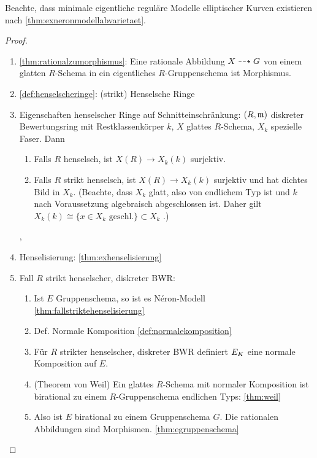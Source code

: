 \documentclass[german]{scrreprt}
\begin{document}
\begin{Satz}
  Beachte, dass minimale eigentliche reguläre Modelle elliptischer
  Kurven existieren nach \autoref{thm:exneronmodellabvarietaet}.
  \begin{proof}
    \begin{enumerate}
    \item \autoref{thm:rationalzumorphismus}:
      Eine rationale Abbildung $X\dashrightarrow G$ von einem glatten
      $R$-Schema in ein eigentliches $R$-Gruppenschema ist Morphismus.
    \item \autoref{def:henselscheringe}: (strikt) Henselsche Ringe
    \item Eigenschaften henselscher Ringe auf Schnitteinschränkung:
      $(R,\mathfrak{m})$ diskreter Bewertungsring mit Restklassenkörper $k$, $X$
      glattes $R$-Schema, $X_k$ spezielle Faser.
      Dann
      \begin{enumerate}[label=(\roman*)]
      \item Falls $R$ henselsch, ist $X(R)\to X_k(k)$ surjektiv.
      \item Falls $R$ strikt henselsch, ist $X(R)\to X_k(k)$ surjektiv
        und hat dichtes Bild in $X_k$.
        (Beachte, dass $X_k$ glatt, also von endlichem Typ ist und $k$
        nach Voraussetzung algebraisch abgeschlossen ist. Daher
        gilt $X_k(k)\cong\{x\in X_k\text{ geschl.}\}\subset X_k$
        \cite[Example 4.1]{wedhorn}.)
      \end{enumerate}
      \cite[Proposition IV.6.4]{silverman2},
      \cite[2.3, Proposition 5]{neron}
    \item Henselisierung: \autoref{thm:exhenselisierung}
    \item Fall $R$ strikt henselscher, diskreter BWR:
      \begin{enumerate}
      \item Ist $E$ Gruppenschema, so ist es Néron-Modell
        \autoref{thm:fallstriktehenselisierung}
      \item Def. Normale Komposition \autoref{def:normalekomposition}
      \item Für $R$ strikter henselscher, diskreter BWR
        definiert $E_{K}$ eine normale Komposition auf $E$.
      \item (Theorem von Weil) Ein glattes $R$-Schema mit normaler
        Komposition ist birational zu einem $R$-Gruppenschema endlichen
        Typs: \autoref{thm:weil}
      \item Also ist $E$ birational zu einem Gruppenschema $G$.
        Die rationalen Abbildungen sind Morphismen.
        \autoref{thm:egruppenschema}

\end{enumerate}
\end{enumerate}
\end{proof}
\end{Satz}
\end{document}

